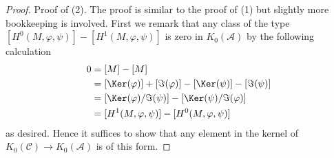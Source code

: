 \begin{proof}
\medskip\noindent
Proof of (2). The proof is similar to the proof of (1) but slightly
more bookkeeping is involved. First we remark that any class of the type
$[H^0(M, \varphi, \psi)] - [H^1(M, \varphi, \psi)]$ is zero
in $K_0(\mathcal{A})$ by the following calculation
\begin{align*}
0 & = [M] - [M] \\
& =  [\Ker(\varphi)] + [\Im(\varphi)]
- [\Ker(\psi)] - [\Im(\psi)] \\
& =
[\Ker(\varphi)/\Im(\psi)] -
[\Ker(\psi)/\Im(\varphi)] \\
& = [H^1(M, \varphi, \psi)] - [H^0(M, \varphi, \psi)]
\end{align*}
as desired. Hence it suffices to show that any element in the kernel
of $K_0(\mathcal{C}) \to K_0(\mathcal{A})$ is of this form.


\end{proof}
